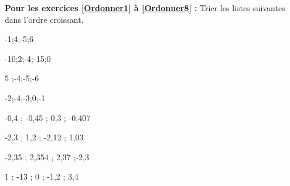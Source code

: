 \textbf{Pour les exercices \ref{Ordonner1} à \ref{Ordonner8} :} Trier les listes suivantes dans l'ordre croissant.

\begin{multicols}{4}
    -1;4;-5;6
    
    -10;2;-4;-15;0
    
    5 ;-4;-5;-6
    
    -2;-4;-3;0;-1
\end{multicols}

\begin{multicols}{4}
    -0,4 ; -0,45 ; 0,3 ; -0,407
    
    -2,3 ; 1,2 ; -2,12 ; 1,03
    
    -2,35 ; 2,354 ; 2,37 ;-2,3
    
    1 ; -13 ; 0 ; -1,2 ; 3,4
\end{multicols}